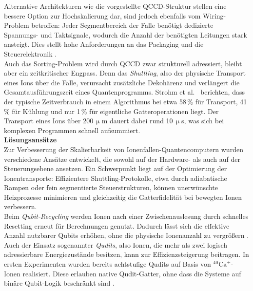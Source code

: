 Alternative Architekturen wie die vorgestellte QCCD-Struktur stellen eine bessere Option zur Hochskalierung dar, sind jedoch ebenfalls vom Wiring-Problem betroffen: Jeder Segmentbereich der Falle benötigt dedizierte Spannungs- und Taktsignale, wodurch die Anzahl der benötigten Leitungen stark ansteigt. Dies stellt hohe Anforderungen an das Packaging und die Steuerelektronik \cite{strohm2024}. \\

Auch das Sorting-Problem wird durch QCCD zwar strukturell adressiert, bleibt aber ein zeitkritischer Engpass. Denn das \textit{Shuttling}, also der physische Transport eines Ions über die Falle, verursacht zusätzliche Dekohärenz und verlängert die Gesamtausführungszeit eines Quantenprogramms. Strohm et al.\ \cite{strohm2024} berichten, dass der typische Zeitverbrauch in einem Algorithmus bei etwa 58\,\% für Transport, 41\,\% für Kühlung und nur 1\,\% für eigentliche Gatteroperationen liegt. Der Transport eines Ions über 200\,$\upmu$m dauert dabei rund 10\,$\upmu$s, was sich bei komplexen Programmen schnell aufsummiert. \\

\textbf{Lösungsansätze} \\
Zur Verbesserung der Skalierbarkeit von Ionenfallen-Quantencomputern wurden verschiedene Ansätze entwickelt, die sowohl auf der Hardware- als auch auf der Steuerungsebene ansetzen. Ein Schwerpunkt liegt auf der Optimierung der Ionentransporte: Effizientere Shuttling-Protokolle, etwa durch adiabatische Rampen oder fein segmentierte Steuerstrukturen, können unerwünschte Heizprozesse minimieren und gleichzeitig die Gatterfidelität bei bewegten Ionen verbessern. \\

Beim \textit{Qubit-Recycling} werden Ionen nach einer Zwischenauslesung durch schnelles Resetting erneut für Berechnungen genutzt. Dadurch lässt sich die effektive Anzahl nutzbarer Qubits erhöhen, ohne die physische Ionenanzahl zu vergrößern \cite{strohm2024}. \\

Auch der Einsatz sogenannter \textit{Qudits}, also Ionen, die mehr als zwei logisch adressierbare Energiezustände besitzen, kann zur Effizienzsteigerung beitragen. In ersten Experimenten wurden bereits achtstufige Qudits auf Basis von $^{40}\mathrm{Ca}^{+}$-Ionen realisiert. Diese erlauben native Qudit-Gatter, ohne dass die Systeme auf binäre Qubit-Logik beschränkt sind \cite{strohm2024}.

